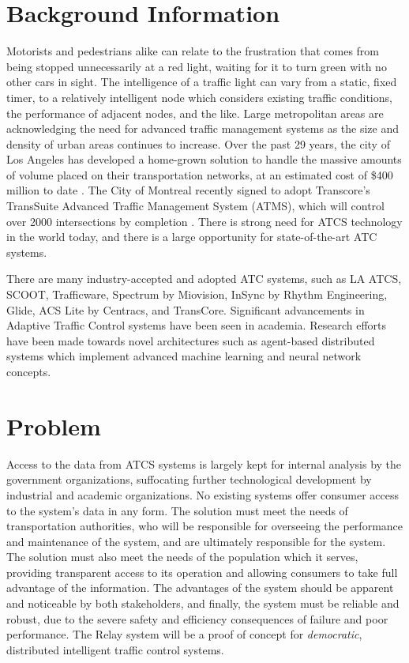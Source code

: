 \documentclass[a4paper,11pt]{report}
\begin{document}
\begin{multicols}{2}
\section{Background Information}
Motorists and pedestrians alike can relate to the frustration that comes from being stopped unnecessarily at a red light, waiting for it to turn green with no other cars in sight.
The intelligence of a traffic light can vary from a static, fixed timer, to a relatively intelligent node which considers existing traffic conditions, the performance of adjacent nodes, and the like.
Large metropolitan areas are acknowledging the need for advanced traffic management systems as the size and density of urban areas continues to increase.
Over the past 29 years, the city of Los Angeles has developed a home-grown solution to handle the massive amounts of volume placed on their transportation networks, at an estimated cost of \$400 million to date \cite{la-atcs-article}.
The City of Montreal recently signed to adopt Transcore's TransSuite Advanced Traffic Management System (ATMS), which will control over 2000 intersections by completion \cite{montreal-transcore}.
There is strong need for ATCS technology in the world today, and there is a large opportunity for state-of-the-art ATC systems.

There are many industry-accepted and adopted ATC systems, such as LA ATCS, SCOOT, Trafficware, Spectrum by Miovision, InSync by Rhythm Engineering, Glide, ACS Lite by Centracs, and TransCore.
Significant advancements in Adaptive Traffic Control systems have been seen in academia.
Research efforts have been made towards novel architectures such as agent-based distributed systems which implement advanced machine learning and neural network concepts\cite{1688100, 5073360, uot-article}.

\section{Problem}

Access to the data from ATCS systems is largely kept for internal analysis by the government organizations, suffocating further technological development by industrial and academic organizations.
No existing systems offer consumer access to the system's data in any form.
The solution must meet the needs of transportation authorities, who will be responsible for overseeing the performance and maintenance of the system, and are ultimately responsible for the system.
The solution must also meet the needs of the population which it serves, providing transparent access to its operation and allowing consumers to take full advantage of the information.
The advantages of the system should be apparent and noticeable by both stakeholders, and finally, the system must be reliable and robust, due to the severe safety and efficiency consequences of failure and poor performance. The Relay system will be a proof of concept for \emph{democratic}, distributed intelligent traffic control systems.


\end{multicols}
\end{document}
